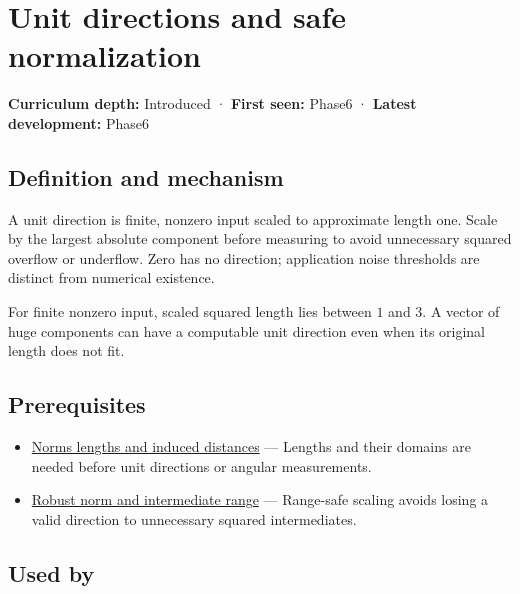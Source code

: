 \hypertarget{appendix-f744e41b95b4}{}\label{referencestart:appendix-f744e41b95b4}
\section{Unit directions and safe normalization}\label{appendix-f744e41b95b4-unit-directions-and-safe-normalization}

\textbf{Curriculum depth:} Introduced · \textbf{First seen:} Phase6 · \textbf{Latest development:} Phase6

\subsection{Definition and mechanism}\label{appendix-f744e41b95b4-definition-and-mechanism}

A unit direction is finite, nonzero input scaled to approximate length one. Scale by the largest absolute component before measuring to avoid unnecessary squared overflow or underflow. Zero has no direction; application noise thresholds are distinct from numerical existence.

For finite nonzero input, scaled squared length lies between \(1\) and \(3\). A vector of huge components can have a computable unit direction even when its original length does not fit.

\subsection{Prerequisites}\label{appendix-f744e41b95b4-prerequisites}

\begin{itemize}
\tightlist
\item
  \hyperref[appendix-49933872bb51]{Norms lengths and induced distances} --- Lengths and their domains are needed before unit directions or angular measurements.
\item
  \hyperref[appendix-7f1e17dcafb1]{Robust norm and intermediate range} --- Range-safe scaling avoids losing a valid direction to unnecessary squared intermediates.
\end{itemize}

\subsection{Used by}\label{appendix-f744e41b95b4-used-by}

